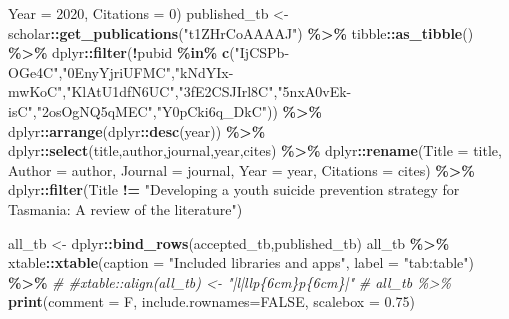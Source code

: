\documentclass[
]{article}
\newenvironment{Shaded}{\begin{snugshade}}{\end{snugshade}}
\newcommand{\CommentTok}[1]{\textcolor[rgb]{0.56,0.35,0.01}{\textit{#1}}}
\newcommand{\DataTypeTok}[1]{\textcolor[rgb]{0.13,0.29,0.53}{#1}}
\newcommand{\DecValTok}[1]{\textcolor[rgb]{0.00,0.00,0.81}{#1}}
\newcommand{\FloatTok}[1]{\textcolor[rgb]{0.00,0.00,0.81}{#1}}
\newcommand{\KeywordTok}[1]{\textcolor[rgb]{0.13,0.29,0.53}{\textbf{#1}}}
\newcommand{\NormalTok}[1]{#1}
\newcommand{\OperatorTok}[1]{\textcolor[rgb]{0.81,0.36,0.00}{\textbf{#1}}}
\newcommand{\OtherTok}[1]{\textcolor[rgb]{0.56,0.35,0.01}{#1}}
\newcommand{\StringTok}[1]{\textcolor[rgb]{0.31,0.60,0.02}{#1}}
\begin{document}
\begin{Shaded}
\begin{Highlighting}[]
                              \DataTypeTok{Year =} \DecValTok{2020}\NormalTok{,}
                              \DataTypeTok{Citations =} \DecValTok{0}\NormalTok{)}
\NormalTok{published\_tb \textless{}{-}}\StringTok{ }\NormalTok{scholar}\OperatorTok{::}\KeywordTok{get\_publications}\NormalTok{(}\StringTok{"t1ZHrCoAAAAJ"}\NormalTok{) }\OperatorTok{\%\textgreater{}\%}
\StringTok{  }\NormalTok{tibble}\OperatorTok{::}\KeywordTok{as\_tibble}\NormalTok{() }\OperatorTok{\%\textgreater{}\%}
\StringTok{  }\NormalTok{dplyr}\OperatorTok{::}\KeywordTok{filter}\NormalTok{(}\OperatorTok{!}\NormalTok{pubid }\OperatorTok{\%in\%}\StringTok{ }\KeywordTok{c}\NormalTok{(}\StringTok{"IjCSPb{-}OGe4C"}\NormalTok{,}\StringTok{"0EnyYjriUFMC"}\NormalTok{,}\StringTok{"kNdYIx{-}mwKoC"}\NormalTok{,}\StringTok{"KlAtU1dfN6UC"}\NormalTok{,}\StringTok{"3fE2CSJIrl8C"}\NormalTok{,}\StringTok{"5nxA0vEk{-}isC"}\NormalTok{,}\StringTok{"2osOgNQ5qMEC"}\NormalTok{,}\StringTok{"Y0pCki6q\_DkC"}\NormalTok{)) }\OperatorTok{\%\textgreater{}\%}
\StringTok{  }\NormalTok{dplyr}\OperatorTok{::}\KeywordTok{arrange}\NormalTok{(dplyr}\OperatorTok{::}\KeywordTok{desc}\NormalTok{(year)) }\OperatorTok{\%\textgreater{}\%}
\StringTok{  }\NormalTok{dplyr}\OperatorTok{::}\KeywordTok{select}\NormalTok{(title,author,journal,year,cites) }\OperatorTok{\%\textgreater{}\%}
\StringTok{  }\NormalTok{dplyr}\OperatorTok{::}\KeywordTok{rename}\NormalTok{(}\DataTypeTok{Title =}\NormalTok{ title, }\DataTypeTok{Author =}\NormalTok{ author, }\DataTypeTok{Journal =}\NormalTok{ journal, }\DataTypeTok{Year =}\NormalTok{ year, }\DataTypeTok{Citations =}\NormalTok{ cites) }\OperatorTok{\%\textgreater{}\%}
\StringTok{  }\NormalTok{dplyr}\OperatorTok{::}\KeywordTok{filter}\NormalTok{(Title }\OperatorTok{!=}\StringTok{ "Developing a youth suicide prevention strategy for Tasmania: A review of the literature"}\NormalTok{)}

\NormalTok{all\_tb \textless{}{-}}\StringTok{ }\NormalTok{dplyr}\OperatorTok{::}\KeywordTok{bind\_rows}\NormalTok{(accepted\_tb,published\_tb) }
\NormalTok{all\_tb }\OperatorTok{\%\textgreater{}\%}\StringTok{  }
\StringTok{  }\NormalTok{xtable}\OperatorTok{::}\KeywordTok{xtable}\NormalTok{(}\DataTypeTok{caption =} \StringTok{"Included libraries and apps"}\NormalTok{, }\DataTypeTok{label =} \StringTok{"tab:table"}\NormalTok{) }\OperatorTok{\%\textgreater{}\%}
\CommentTok{\# \#xtable::align(all\_tb) \textless{}{-} "|l|llp\{6cm\}p\{6cm\}|"}
\CommentTok{\# all\_tb \%\textgreater{}\%}
\StringTok{  }\KeywordTok{print}\NormalTok{(}\DataTypeTok{comment =}\NormalTok{ F,}
        \DataTypeTok{include.rownames=}\OtherTok{FALSE}\NormalTok{,}
        \DataTypeTok{scalebox =} \FloatTok{0.75}\NormalTok{)}
\end{Highlighting}
\end{Shaded}
\end{document}
